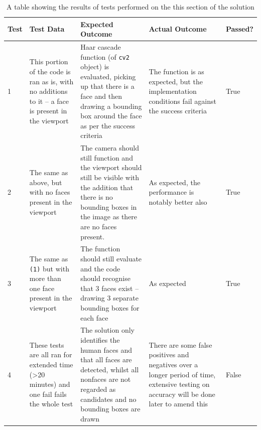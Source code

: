 \documentclass[9pt]{article}
\begin{document}
\begin{table}[H]        
	\centering             
	\begin{tabularx}{\textwidth}{lXXXl}
		Test & \textbf{Test Data}                                                                                  & \textbf{Expected Outcome} & \textbf{Actual Outcome} & \textbf{Passed?} \\
		\midrule
		1 & This portion of the code is ran as is, with no additions to it -- a face is present in the viewport & Haar cascade function (of \texttt{cv2} object) is evaluated, picking up that there is a face and then drawing a bounding box around the face as per the success criteria & The function is as expected, but the implementation conditions fail against the success criteria & True \\
		2 & The same as above, but with no faces present in the viewport & The camera should still function and the viewport should still be visible with the addition that there is no bounding boxes in the image as there are no faces present. & As expected, the performance is notably better also & True   \\
		3 & The same as \texttt{(1)} but with more than one face present in the viewport  & The function should still evaluate and the code should recognise that 3 faces exist -- drawing 3 separate bounding boxes for each face & As expected & True \\
		4 & These tests are all ran for extended time (>20 minutes) and one fail fails the whole test & The solution only identifies the
		human faces and that all faces
		are detected, whilst all nonfaces are not regarded as candidates and no bounding boxes are
		drawn & There are some false positives and negatives over a longer period of time, extensive testing on accuracy will be done later to amend this & False \\
		\bottomrule
	\end{tabularx}
	\caption{A table showing the results of tests performed on the this section of the solution}
	\label{tab_testingCameraTest}
\end{table}
\end{document}
